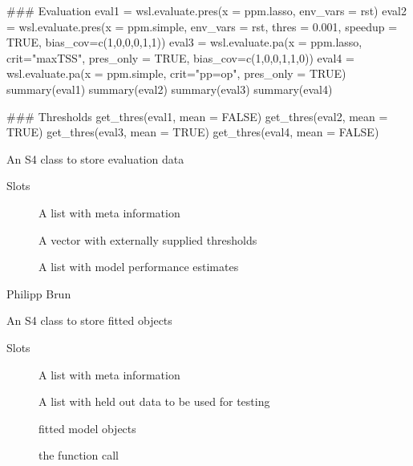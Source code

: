 \documentclass[a4paper]{book}
\begin{document}
\begin{Examples}
\begin{ExampleCode}
### Evaluation
eval1 = wsl.evaluate.pres(x = ppm.lasso,
                          env_vars = rst)
eval2 = wsl.evaluate.pres(x = ppm.simple,
                          env_vars = rst,
                          thres = 0.001,
                          speedup = TRUE,
                          bias_cov=c(1,0,0,0,1,1))
eval3 = wsl.evaluate.pa(x = ppm.lasso,
                        crit="maxTSS",
                        pres_only = TRUE,
                        bias_cov=c(1,0,0,1,1,0))
eval4 = wsl.evaluate.pa(x = ppm.simple,
                       crit="pp=op",
                       pres_only = TRUE)
summary(eval1)
summary(eval2)
summary(eval3)
summary(eval4)

### Thresholds
get_thres(eval1, mean = FALSE)
get_thres(eval2, mean = TRUE)
get_thres(eval3, mean = TRUE)
get_thres(eval4, mean = FALSE)

\end{ExampleCode}
\end{Examples}
%
\begin{Description}\relax
An S4 class to store evaluation data
\end{Description}
%
\begin{Section}{Slots}

\begin{description}

\item[] A list with meta information

\item[] A vector with externally supplied thresholds

\item[] A list with model performance estimates

\end{description}
\end{Section}
%
\begin{Author}\relax
Philipp Brun
\end{Author}
%
\begin{Description}\relax
An S4 class to store fitted objects
\end{Description}
%
\begin{Section}{Slots}

\begin{description}

\item[] A list with meta information

\item[] A list with held out data to be used for testing

\item[] fitted model objects

\item[] the function call

\end{description}
\end{Section}
\end{document}
